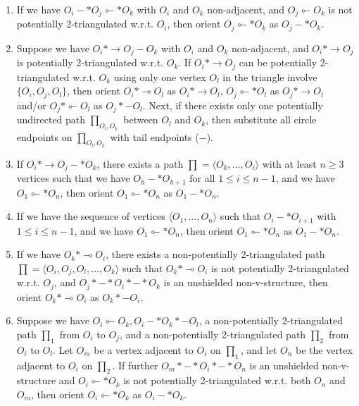 \documentclass[11pt]{article}
\theoremstyle{definition}
\begin{document}
\begin{appendices}
\begin{algorithm}
\begin{algorithmic}[1]
\begin{enumerate}[nolistsep, label=(\roman*)]
    \item If we have $O_i -* O_j \multimapinv* O_k$ with $O_i$ and $O_k$ non-adjacent, and $O_j \multimapinv O_k$ is not potentially 2-triangulated w.r.t. $O_i$, then orient $O_j \multimapinv* O_k$ as $O_j -* O_k$.

    \item Suppose we have $O_i * \rightarrow O_j - O_k$ with $O_i$ and $O_k$ non-adjacent, and $O_i * \rightarrow O_j$ is potentially 2-triangulated w.r.t. $O_k$. If $O_i * \rightarrow O_j$ can be potentially 2-triangulated w.r.t. $O_k$ using only one vertex $O_l$ in the triangle involve $\{O_i, O_j, O_l \}$, then orient $O_i * \multimap O_l$ as $O_i * \rightarrow O_l$, $O_j \multimapinv * O_l$ as $O_j * \rightarrow O_l$ and/or $O_j * \multimapinv O_l$ as $O_j *- O_l$. Next, if there exists only one potentially undirected path $\prod_{O_l, O_k}$ between $O_l$ and $O_k$, then substitute all circle endpoints on $\prod_{O_l, O_k}$ with tail endpoints ($-$).

    \item If $O_i * \rightarrow O_j -* O_k$, there exists a path $\prod = \langle O_k, ..., O_i \rangle$ with at least $n \ge 3$ vertices such that we have $O_h -* O_{h+1}$ for all $ 1 \le i \le n -1$, and we have $O_1 \multimapinv * O_n$, then orient $O_1 \multimapinv * O_n$ as $O_1 - * O_n$.

    \item If we have the sequence of vertices $\langle O_1, ..., O_n \rangle$ such that $O_i -* O_{i+1}$ with $1 \le i \le n-1$, and we have $O_1 \multimapinv* O_n$, then orient $O_1 \multimapinv * O_n$ as $O_1 -* O_n$.

    \item If we have $O_k * \multimap O_i$, there exists a non-potentially 2-triangulated path $\prod = \langle O_i, O_j, O_l, ..., O_k \rangle$ such that $O_k * \multimap O_i$ is not potentially 2-triangulated w.r.t. $O_j$, and $O_j *-* O_i *-* O_k$ is an unshielded non-v-structure, then orient $O_k * \multimap O_i$ as $O_k *- O_i$.

    \item Suppose we have $O_i \multimapinv O_k, O_i -* O_k *- O_l$, a non-potentially 2-triangulated path $\prod_1$ from $O_i$ to $O_j$, and a non-potentially 2-triangulated path $\prod_2$ from $O_i$ to $O_l$. Let $O_m$ be a vertex adjacent to $O_i$ on $\prod_1$, and let $O_n$ be the vertex adjacent to $O_i$ on $\prod_2$. If further $O_m *-* O_i *-* O_n$ is an unshielded non-v-structure and $O_i \multimapinv * O_k$ is not potentially 2-triangulated w.r.t. both $O_n$ and $O_m$, then orient $O_i \multimapinv * O_k$ as $O_i -* O_k$.

    
\end{enumerate}


\end{algorithmic}
\end{algorithm}

\end{appendices}
\end{document}
